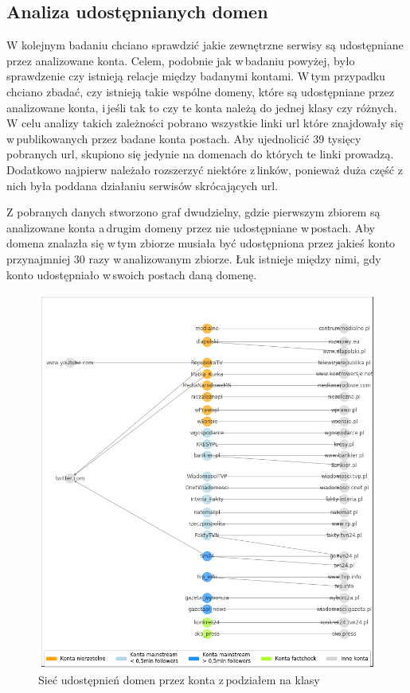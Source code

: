 \subsection{Analiza udostępnianych domen }
W kolejnym badaniu chciano sprawdzić jakie zewnętrzne serwisy są udostępniane przez analizowane konta. Celem, podobnie jak w\,badaniu powyżej, było sprawdzenie czy istnieją relacje między badanymi kontami. W\,tym przypadku chciano zbadać, czy istnieją takie wspólne domeny, które są udostępniane przez analizowane konta, i\,jeśli tak to czy te konta należą do jednej klasy czy różnych.
W celu analizy takich zależności pobrano wszystkie linki url które znajdowały się w\,publikowanych przez badane konta postach. Aby ujednolicić 39 tysięcy pobranych url, skupiono się jedynie na domenach do których te linki prowadzą. Dodatkowo najpierw należało rozszerzyć niektóre z\,linków, ponieważ duża część z\,nich była poddana działaniu serwisów skrócających url. 
\par
Z pobranych danych stworzono graf dwudzielny, gdzie pierwszym zbiorem są analizowane konta a\,drugim domeny przez nie udostępniane w\,postach. Aby domena znalazła się w\,tym zbiorze musiała być udostępniona przez jakieś konto przynajmniej 30 razy w\,analizowanym zbiorze. Łuk istnieje między nimi, gdy konto udostępniało w\,swoich postach daną domenę. 
\begin{figure}[!h]
	\centering \includegraphics[width=1.0\linewidth]{img/results/connectionwithlikns.png}
	\caption{Sieć udostępnień domen przez konta z\,podziałem na klasy} \label{fig:connectedlinks}
\end{figure}
